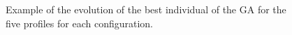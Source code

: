\documentclass{sig-alternate}
\begin{document}
\begin{figure}[htb]
\centering

\caption{Example of the evolution of the best individual of the GA for the five
  profiles for each configuration.}

\label{fig:boxplots}
\end{figure}
\end{document}
